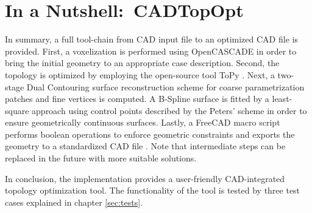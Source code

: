 \section{In a Nutshell:\ \acl{CADTopOpt}}
\label{sec:nutshell}
In summary, a full tool-chain from CAD input file to an optimized CAD file is provided. First, a voxelization is performed using OpenCASCADE in order to bring the initial geometry to an appropriate case description. Second, the topology is optimized by employing the open-source tool ToPy \cite{ToPy}.  
Next, a two-stage Dual Contouring surface reconstruction scheme for coarse parametrization patches and fine vertices is computed.
A B-Spline surface is fitted by a least-square approach using control points described by the Peters' scheme \cite{peters1992constructing} in order to ensure geometrically continuous surfaces. Lastly, a FreeCAD macro script performs boolean operations to enforce geometric constraints and exports the geometry to a standardized CAD file \cite{FreeCAD}.
Note that intermediate steps can be replaced in the future with more suitable solutions. 

In conclusion, the implementation provides a user-friendly CAD-integrated topology optimization tool. The functionality of the tool is tested by three test cases explained in chapter \ref{sec:tests}.

